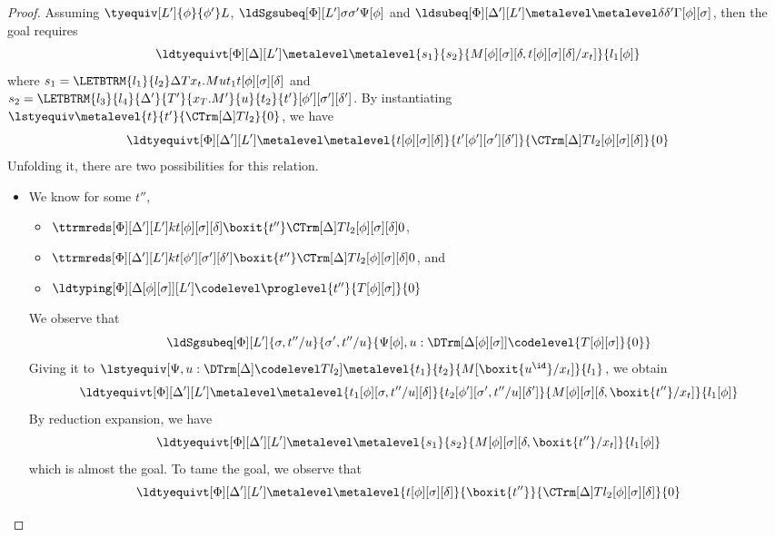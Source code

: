 \begin{proof}
  Assuming $\tyequiv[L']{\phi}{\phi'}L$,
  $\ldSgsubeq[\Phi][L'] \sigma{\sigma'}{\Psi[\phi]}$ and
  $\ldsubeq[\Phi][\Delta'][L'] \metalevel \metalevel \delta{\delta'}{\Gamma[\phi][\sigma]}$, then
  the goal requires
  \[
    \ldtyequivt[\Phi][\Delta][L']\metalevel \metalevel{s_1}{s_2}{M[\phi][\sigma][\delta,t[\phi][\sigma][\delta]/x_t]}{l_1[\phi]}
  \]
  where $s_1 = {\LETBTRM{l_1}{l_2} \Delta{T}{x_t.M}{u}{t_1}t[\phi][\sigma][\delta]}$
  and\\
  $s_2 = {\LETBTRM{l_3}{l_4}{\Delta'}{T'}{x_T.M'}{u}{t_2}{t'}[\phi'][\sigma'][\delta']}$.
  By instantiating\\
  $\lstyequiv \metalevel{t}{t'}{\CTrm[\Delta]T{l_2}}{0}$, we have
  \[
    \ldtyequivt[\Phi][\Delta'][L']\metalevel \metalevel{t[\phi][\sigma][\delta]}{{t'}[\phi'][\sigma'][\delta']}{\CTrm[\Delta]T{l_2}[\phi][\sigma][\delta]}{0}
  \]
  Unfolding it, there are two possibilities for this relation.
  \begin{itemize}[label=Case]
  \item We know for some $t''$,
    \begin{itemize}
    \item $\ttrmreds[\Phi][\Delta'][L']
      k{t[\phi][\sigma][\delta]}{\boxit{t''}}{\CTrm[\Delta]T{l_2}[\phi][\sigma][\delta]}{0}$,
    \item $\ttrmreds[\Phi][\Delta'][L']
      k{t[\phi'][\sigma'][\delta']}{\boxit{t''}}{\CTrm[\Delta]T{l_2}[\phi][\sigma][\delta]}{0}$,
      and
    \item $\ldtyping[\Phi][\Delta[\phi][\sigma]][L']\codelevel \proglevel{t''}{T[\phi][\sigma]}{0}$
    \end{itemize}
    We observe that
    \[
      \ldSgsubeq[\Phi][L']{\sigma,t''/u}{\sigma', t''/u}{\Psi[\phi], u :
        \DTrm[\Delta[\phi][\sigma]] \codelevel{T[\phi][\sigma]}{0}}
    \]
    Giving it to $\lstyequiv[\Psi, u : \DTrm[\Delta]\codelevel T
    {l_2}]\metalevel{t_1}{t_2}{M[\boxit{u^\id}/x_t]}{l_1}$, we obtain
    \[
      \ldtyequivt[\Phi][\Delta'][L']\metalevel
      \metalevel{t_1[\phi][\sigma,t''/u][\delta]}{{t_2}[\phi'][\sigma',t''/u][\delta']}{M[\phi][\sigma][\delta,
        \boxit{t''}/x_t]}{l_1[\phi]}
    \]
    By reduction expansion, we have 
    \[
      \ldtyequivt[\Phi][\Delta'][L']\metalevel \metalevel{s_1}{s_2}{M[\phi][\sigma][\delta,
        \boxit{t''}/x_t]}{l_1[\phi]}
    \]
    which is almost the goal.  %
    To tame the goal, we observe that
    \[
      \ldtyequivt[\Phi][\Delta'][L']\metalevel \metalevel{t[\phi][\sigma][\delta]}{\boxit{t''}}{\CTrm[\Delta]T{l_2}[\phi][\sigma][\delta]}{0}
\]
\end{itemize}
\end{proof}
